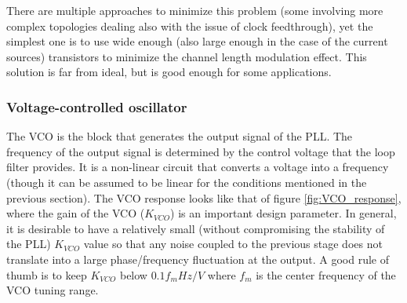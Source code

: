 \noindent There are multiple approaches to minimize this problem (some involving more complex topologies dealing also with the issue of clock feedthrough), yet 
the simplest one is to use wide enough (also large enough in the case of the current sources) transistors to minimize the channel length 
modulation effect. This solution is far from ideal, but is good enough for some applications.

\subsubsection{Voltage-controlled oscillator}
The VCO is the block that generates the output signal of the PLL. The frequency of the output signal is determined by the control voltage
that the loop filter provides. It is a non-linear circuit that converts a voltage into a frequency (though it can be assumed to be linear 
for the conditions mentioned in the previous section). The VCO response looks like that of figure \ref{fig:VCO_response}, where the gain 
of the VCO ($K_{VCO}$) is an important design parameter. In general, it is desirable to have a relatively small (without compromising the 
stability of the PLL) $K_{VCO}$ value so that any noise coupled to the previous stage does not translate into a large phase/frequency 
fluctuation at the output. A good rule of thumb is to keep $K_{VCO}$ below $0.1 f_m Hz/V$ where $f_m$ is the center frequency of the VCO
tuning range.

